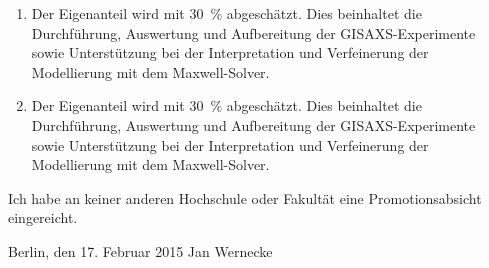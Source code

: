 \begin{enumerate}[label=\arabic*) ]
    \item {}

        Der Eigenanteil wird mit \SI{30}{\%} abgeschätzt.
        Dies beinhaltet die Durchführung, Auswertung und Aufbereitung der GISAXS-Experimente sowie Unterstützung bei der Interpretation und Verfeinerung der Modellierung mit dem Maxwell-Solver.

    \item {}

        Der Eigenanteil wird mit \SI{30}{\%} abgeschätzt.
        Dies beinhaltet die Durchführung, Auswertung und Aufbereitung der GISAXS-Experimente sowie Unterstützung bei der Interpretation und Verfeinerung der Modellierung mit dem Maxwell-Solver.

\end{enumerate}


Ich habe an keiner anderen Hochschule oder Fakultät eine Promotionsabsicht eingereicht.

\vspace{3cm}

\noindent Berlin, den 17. Februar 2015 \hfill Jan Wernecke

\cleardoublepage
